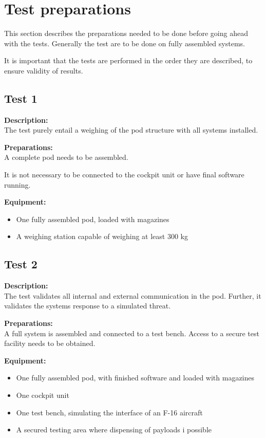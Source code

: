 \documentclass[Main]{subfiles}
\begin{document}
\setcounter{chapter}{2}
\chapter{Test preparations}
This section describes the preparations needed to be done before going ahead with the tests.
Generally the test are to be done on fully assembled systems.

It is important that the tests are performed in the order they are described, to ensure validity of results.

\section{Test 1}
\textbf{Description: }\\
The test purely entail a weighing of the pod structure with all systems installed.

\textbf{Preparations: }\\
A complete pod needs to be assembled. 

It is not necessary to be connected to the cockpit unit or have final software running.

\textbf{Equipment:}
\begin{itemize}
\item One fully assembled pod, loaded with magazines
\item A weighing station capable of weighing at least 300 kg
\end{itemize}


\newpage
\section{Test 2}
\textbf{Description: }\\
The test validates all internal and external communication in the pod.
Further, it validates the systems response to a simulated threat.

\textbf{Preparations: }\\
A full system is assembled and connected to a test bench.
Access to a secure test facility needs to be obtained.

\textbf{Equipment:}
\begin{itemize}
\item One fully assembled pod, with finished software and loaded with magazines
\item One cockpit unit
\item One test bench, simulating the interface of an F-16 aircraft
\item A secured testing area where dispensing of payloads i possible

\end{itemize}
\end{document}
